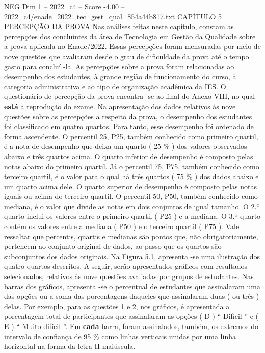 \begin{textsample}{NEG Dim 1 – 2022\_c4 – Score -4.00 – 2022\_c4/enade\_2022\_tec\_gest\_qual\_854a44b817.txt}  \label{ex:f1_neg_173}
CAPÍTULO 5 PERCEPÇÃO DA PROVA Nas análises feitas neste capítulo, constam as percepções dos concluintes da área de Tecnologia em Gestão da Qualidade sobre a prova aplicada no Enade/2022.
Essas percepções foram mensuradas por meio de nove questões que avaliaram desde o grau de dificuldade da prova até o tempo gasto para concluí -la.
As percepções sobre a prova foram relacionadas ao desempenho dos estudantes, à grande região de funcionamento do curso, à categoria administrativa e ao tipo de organização acadêmica da IES.
O questionário de percepção da prova encontra -se ao final do Anexo VIII, no qual \textbf{está} a reprodução do exame.
Na apresentação dos dados relativos às nove questões sobre as percepções a respeito da prova, o desempenho dos estudantes foi classificado em quatro quartos.
Para tanto, esse desempenho foi ordenado de forma ascendente.
O percentil 25, P25, também conhecido como primeiro quartil, é a nota de desempenho que deixa um quarto ( 25 \% ) dos valores observados abaixo e três quartos acima.
O quarto inferior de desempenho é composto pelas notas abaixo do primeiro quartil.
Já o percentil 75, P75, também conhecido como terceiro quartil, é o valor para o qual há três quartos ( 75 \% ) dos dados abaixo e um quarto acima dele.
O quarto superior de desempenho é composto pelas notas iguais ou acima do terceiro quartil.
O percentil 50, P50, também conhecido como mediana, é o valor que divide as notas em dois conjuntos de igual tamanho.
O 2.º quarto inclui os valores entre o primeiro quartil ( P25 ) e a mediana.
O 3.º quarto contém os valores entre a mediana ( P50 ) e o terceiro quartil ( P75 ).
Vale ressaltar que percentis, quartis e medianas são pontos que, não obrigatoriamente, pertencem ao conjunto original de dados, ao passo que os quartos são subconjuntos dos dados originais.
Na Figura 5.1, apresenta -se uma ilustração dos quatro quartos descritos.
A seguir, serão apresentados gráficos com resultados selecionados, relativos às nove questões avaliadas por grupos de estudantes.
Nas barras dos gráficos, apresenta -se o percentual de estudantes que assinalaram uma das opções ou a soma das porcentagens daqueles que assinalaram duas ( ou três ) delas.
Por exemplo, para as questões 1 e 2, nos gráficos, é apresentada a porcentagem total de participantes que assinalaram as opções ( D ) “ Difícil ” e ( E ) “ Muito difícil ”.
Em \textbf{cada} barra, foram assinalados, também, os extremos do intervalo de confiança de 95 \% como linhas verticais unidas por uma linha horizontal na forma da letra H maiúscula.

\end{textsample}
